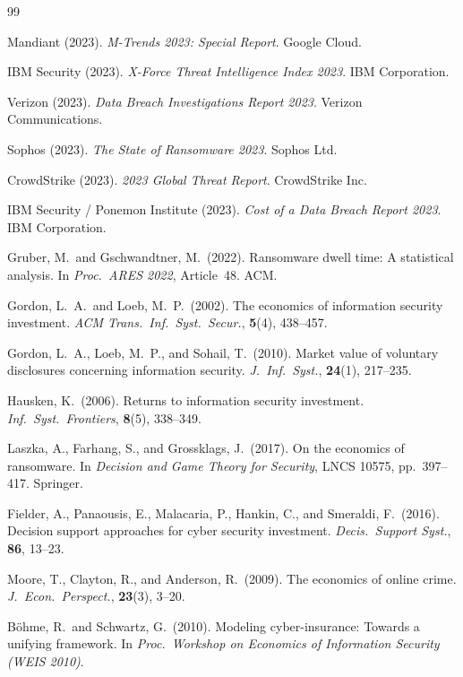 \documentclass[12pt,a4paper]{article}
\theoremstyle{plain}
\theoremstyle{definition}
\theoremstyle{remark}
\begin{document}
\clearpage
\begin{thebibliography}{99}

Mandiant (2023).
\textit{M-Trends 2023: Special Report}.
Google Cloud.

IBM Security (2023).
\textit{X-Force Threat Intelligence Index 2023}.
IBM Corporation.

Verizon (2023).
\textit{Data Breach Investigations Report 2023}.
Verizon Communications.

Sophos (2023).
\textit{The State of Ransomware 2023}.
Sophos Ltd.

CrowdStrike (2023).
\textit{2023 Global Threat Report}.
CrowdStrike Inc.

IBM Security / Ponemon Institute (2023).
\textit{Cost of a Data Breach Report 2023}.
IBM Corporation.

Gruber, M.\ and Gschwandtner, M.\ (2022).
Ransomware dwell time: A statistical analysis.
In \textit{Proc.\ ARES 2022}, Article~48.
ACM.

Gordon, L.\ A.\ and Loeb, M.\ P.\ (2002).
The economics of information security investment.
\textit{ACM Trans.\ Inf.\ Syst.\ Secur.}, \textbf{5}(4), 438--457.

Gordon, L.\ A., Loeb, M.\ P., and Sohail, T.\ (2010).
Market value of voluntary disclosures concerning information security.
\textit{J.\ Inf.\ Syst.}, \textbf{24}(1), 217--235.

Hausken, K.\ (2006).
Returns to information security investment.
\textit{Inf.\ Syst.\ Frontiers}, \textbf{8}(5), 338--349.

Laszka, A., Farhang, S., and Grossklags, J.\ (2017).
On the economics of ransomware.
In \textit{Decision and Game Theory for Security},
LNCS 10575, pp.~397--417.
Springer.

Fielder, A., Panaousis, E., Malacaria, P., Hankin, C., and Smeraldi, F.\ (2016).
Decision support approaches for cyber security investment.
\textit{Decis.\ Support Syst.}, \textbf{86}, 13--23.

Moore, T., Clayton, R., and Anderson, R.\ (2009).
The economics of online crime.
\textit{J.\ Econ.\ Perspect.}, \textbf{23}(3), 3--20.

B{\"o}hme, R.\ and Schwartz, G.\ (2010).
Modeling cyber-insurance: Towards a unifying framework.
In \textit{Proc.\ Workshop on Economics of Information Security (WEIS 2010)}.


\end{thebibliography}
\end{document}
